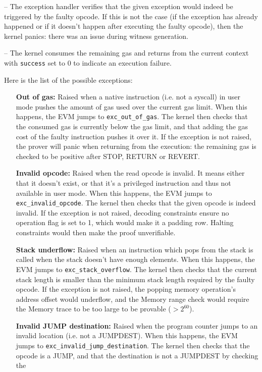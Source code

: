 -- The exception handler verifies that the given exception would indeed be triggered by the faulty opcode. If this is not the case (if the exception has already happened or if it doesn't happen after executing
the faulty opcode), then the kernel panics: there was an issue during witness generation.

-- The kernel consumes the remaining gas and returns from the current context with \texttt{success} set to 0 to indicate an execution failure.

Here is the list of the possible exceptions:

\begin{enumerate}[align=left]
  \item[\textbf{Out of gas:}] Raised when a native instruction (i.e. not a syscall) in user mode pushes the amount of gas used over the current gas limit.
When this happens, the EVM jumps to \texttt{exc\_out\_of\_gas}. The kernel then checks that the consumed gas is currently below the gas limit,
and that adding the gas cost of the faulty instruction pushes it over it.
If the exception is not raised, the prover will panic when returning from the execution: the remaining gas is checked to be positive after STOP, RETURN or REVERT.
  \item[\textbf{Invalid opcode:}] Raised when the read opcode is invalid. It means either that it doesn't exist, or that it's a privileged instruction and
thus not available in user mode. When this happens, the EVM jumps to \texttt{exc\_invalid\_opcode}. The kernel then checks that the given opcode is indeed invalid.
If the exception is not raised, decoding constraints ensure no operation flag is set to 1, which would make it a padding row. Halting constraints would then make the proof
unverifiable.
  \item[\textbf{Stack underflow:}] Raised when an instruction which pops from the stack is called when the stack doesn't have enough elements.
When this happens, the EVM jumps to \texttt{exc\_stack\_overflow}. The kernel then checks that the current stack length is smaller than the minimum 
stack length required by the faulty opcode.
If the exception is not raised, the popping memory operation's address offset would underflow, and the Memory range check would require the Memory trace to be too
large to be provable ($>2^{60}$).
  \item[\textbf{Invalid JUMP destination:}] Raised when the program counter jumps to an invalid location (i.e. not a JUMPDEST). When this happens, the EVM jumps to
\texttt{exc\_invalid\_jump\_destination}. The kernel then checks that the opcode is a JUMP, and that the destination is not a JUMPDEST by checking the

\end{enumerate}
